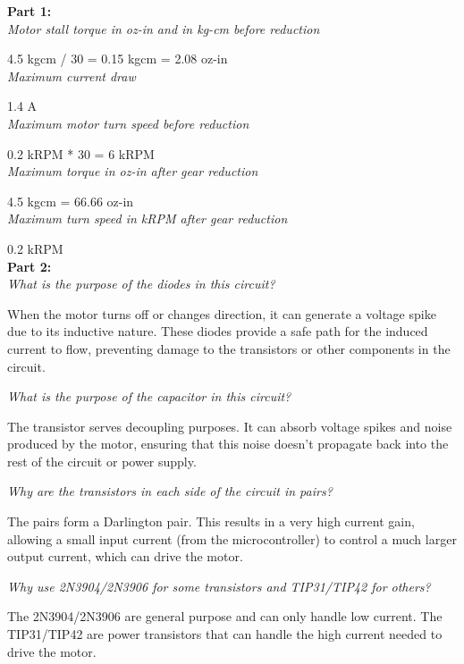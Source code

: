 \documentclass[CMPE]{KGCOEReport}
\begin{document}
\textbf{Part 1:}\\

\emph{Motor stall torque in oz-in and in kg-cm before reduction}

4.5 kgcm / 30 = 0.15 kgcm = 2.08 oz-in\\

\emph{Maximum current draw}

1.4 A\\

\emph{Maximum motor turn speed before reduction}

0.2 kRPM * 30 = 6 kRPM\\

\emph{Maximum torque in oz-in after gear reduction}

4.5 kgcm = 66.66 oz-in\\

\emph{Maximum turn speed in kRPM after gear reduction}

0.2 kRPM\\


\textbf{Part 2:}\\

\emph{What is the purpose of the diodes in this circuit?}

When the motor turns off or changes direction, it can generate a voltage spike due to its inductive nature. These diodes provide a safe path for the induced current to flow, preventing damage to the transistors or other components in the circuit.
\bigskip

\emph{What is the purpose of the capacitor in this circuit?}

The transistor serves decoupling purposes. It can absorb voltage spikes and noise produced by the motor, ensuring that this noise doesn't propagate back into the rest of the circuit or power supply.
\bigskip

\emph{Why are the transistors in each side of the circuit in pairs?}

The pairs form a Darlington pair. This results in a very high current gain, allowing a small input current (from the microcontroller) to control a much larger output current, which can drive the motor.
\bigskip

\emph{Why use 2N3904/2N3906 for some transistors and TIP31/TIP42 for others?}

The 2N3904/2N3906 are general purpose and can only handle low current. The TIP31/TIP42 are power transistors that can handle the high current needed to drive the motor.
\end{document}
